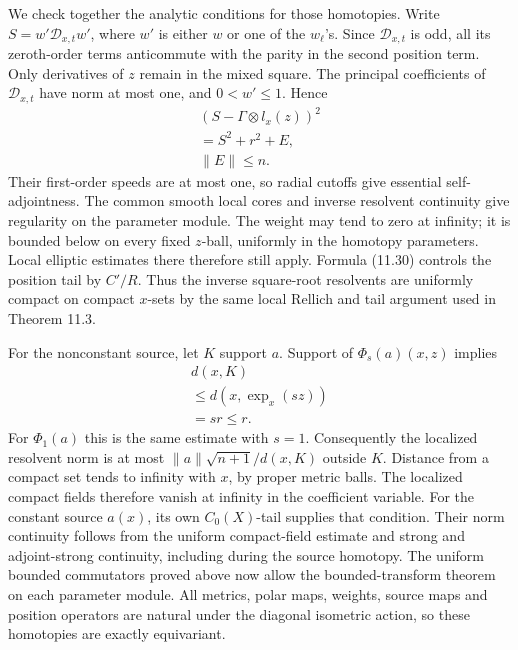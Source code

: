 \documentclass[
  11pt,
]{article}
\begin{document}
We check together the analytic conditions for those homotopies. Write
\(S=w'\mathscr D_{x,t}w'\), where \(w'\) is either \(w\) or one of the
\(w_\ell\)'s. Since \(\mathscr D_{x,t}\) is odd, all its zeroth-order
terms anticommute with the parity in the second position term. Only
derivatives of \(z\) remain in the mixed square. The principal
coefficients of \(\mathscr D_{x,t}\) have norm at most one, and
\(0<w'\leq1\). Hence \[
\begin{gathered}
(S-\Gamma\otimes l_x(z))^2\\
=S^2+r^2+E,\\
\|E\|\leq n.
\end{gathered}
\tag{11.30}
\] Their first-order speeds are at most one, so radial cutoffs give
essential self-adjointness. The common smooth local cores and inverse
resolvent continuity give regularity on the parameter module. The weight
may tend to zero at infinity; it is bounded below on every fixed
\(z\)-ball, uniformly in the homotopy parameters. Local elliptic
estimates there therefore still apply. Formula (11.30) controls the
position tail by \(C'/R\). Thus the inverse square-root resolvents are
uniformly compact on compact \(x\)-sets by the same local Rellich and
tail argument used in Theorem 11.3.

For the nonconstant source, let \(K\) support \(a\). Support of
\(\Phi_s(a)(x,z)\) implies \[
\begin{gathered}
d(x,K)\\
\leq d(x,\exp_x(sz))\\
=s r\leq r.
\end{gathered}
\tag{11.31}
\] For \(\Phi_1(a)\) this is the same estimate with \(s=1\).
Consequently the localized resolvent norm is at most
\(\|a\|\sqrt{n+1}/d(x,K)\) outside \(K\). Distance from a compact set
tends to infinity with \(x\), by proper metric balls. The localized
compact fields therefore vanish at infinity in the coefficient variable.
For the constant source \(a(x)\), its own \(C_0(X)\)-tail supplies that
condition. Their norm continuity follows from the uniform compact-field
estimate and strong and adjoint-strong continuity, including during the
source homotopy. The uniform bounded commutators proved above now allow
the bounded-transform theorem on each parameter module. All metrics,
polar maps, weights, source maps and position operators are natural
under the diagonal isometric action, so these homotopies are exactly
equivariant.
\end{document}
